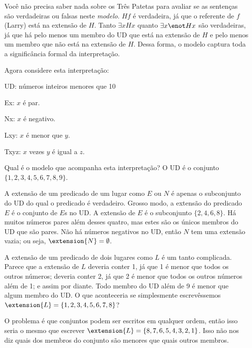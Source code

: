 Você não precisa saber nada sobre os Três Patetas para avaliar se as sentenças são verdadeiras ou falsas neste \emph{modelo}. $Hf$ é verdadeira, já que o referente de $f$ (Larry) está na extensão de $H$. Tanto $\exists x Hx$ quanto $\exists x \enot Hx$ são verdadeiras, já que há pelo menos um membro do UD que está na extensão de $H$ e pelo menos um membro que não está na extensão de $H$. Dessa forma, o modelo captura toda a significância formal da interpretação.

Agora considere esta interpretação:
\begin{ekey}
\item{UD:} números inteiros menores que 10
\item{Ex:} $x$ é par.
\item{Nx:} $x$ é negativo.
\item{Lxy:} $x$ é menor que $y$.
\item{Txyz:} $x$ vezes $y$ é igual a $z$.
\end{ekey}
Qual é o modelo que acompanha esta interpretação?
O UD é o conjunto $\{1,2,3,4,5,6,7,8,9\}$.

A extensão de um predicado de um lugar como $E$ ou $N$ é apenas o subconjunto do UD do qual o predicado é verdadeiro. Grosso modo, a extensão do predicado $E$ é o conjunto de $E$s no UD.
A extensão de $E$ é o subconjunto $\{2,4,6,8\}$. Há muitos números pares além desses quatro, mas estes são os únicos membros do UD que são pares. Não há números negativos no UD, então $N$ tem uma extensão vazia; ou seja, $\extension{N}=\emptyset$.

A extensão de um predicado de dois lugares como $L$ é um tanto complicada. Parece que a extensão de $L$ deveria conter 1, já que 1 é menor que todos os outros números; deveria conter 2, já que 2 é menor que todos os outros números além de 1; e assim por diante. Todo membro do UD além de 9 é menor que algum membro do UD. O que aconteceria se simplesmente escrevêssemos $\extension{L}=\{1,2,3,4,5,6,7,8\}$?

O problema é que conjuntos podem ser escritos em qualquer ordem, então isso seria o mesmo que escrever $\extension{L}=\{8,7,6,5,4,3,2,1\}$. Isso não nos diz quais dos membros do conjunto são menores que quais outros membros.

